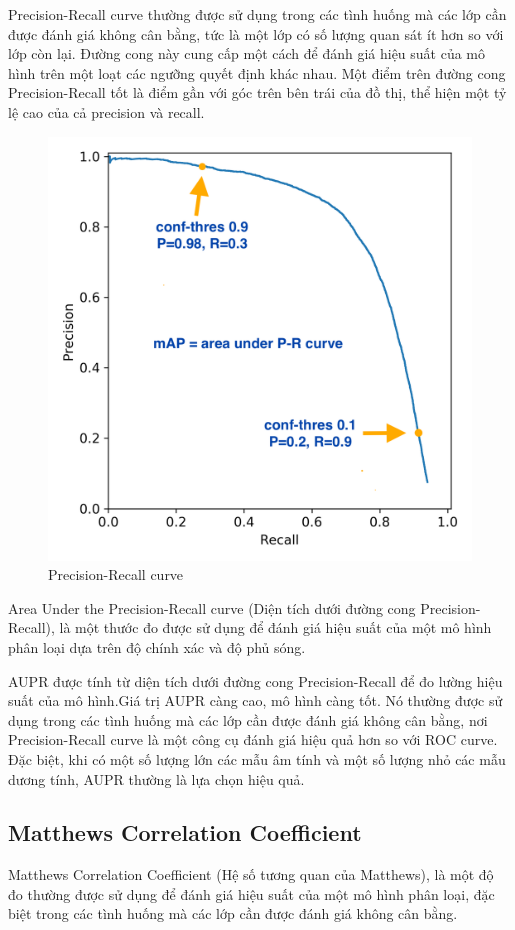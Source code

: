 Precision-Recall curve thường được sử dụng trong các tình huống mà các lớp cần được đánh giá không cân bằng, tức là một lớp có số lượng quan sát ít hơn so với lớp còn lại. Đường cong này cung cấp một cách để đánh giá hiệu suất của mô hình trên một loạt các ngưỡng quyết định khác nhau. Một điểm trên đường cong Precision-Recall tốt là điểm gần với góc trên bên trái của đồ thị, thể hiện một tỷ lệ cao của cả precision và recall.

\begin{figure}[H]
    \centering
    \includegraphics[width=0.7\linewidth]{Images/pr.png}
    \caption{Precision-Recall curve\cite{yolov3issue}}
    \label{pr_curve}
\end{figure}

Area Under the Precision-Recall curve (Diện tích dưới đường cong Precision-Recall), là một thước đo được sử dụng để đánh giá hiệu suất của một mô hình phân loại dựa trên độ chính xác và độ phủ sóng.

AUPR được tính từ diện tích dưới đường cong Precision-Recall để đo lường hiệu suất của mô hình.Giá trị AUPR càng cao, mô hình càng tốt. Nó thường được sử dụng trong các tình huống mà các lớp cần được đánh giá không cân bằng, nơi Precision-Recall curve là một công cụ đánh giá hiệu quả hơn so với ROC curve. Đặc biệt, khi có một số lượng lớn các mẫu âm tính và một số lượng nhỏ các mẫu dương tính, AUPR thường là lựa chọn hiệu quả.

\subsection{Matthews Correlation Coefficient}
Matthews Correlation Coefficient (Hệ số tương quan của Matthews), là một độ đo thường được sử dụng để đánh giá hiệu suất của một mô hình phân loại, đặc biệt trong các tình huống mà các lớp cần được đánh giá không cân bằng.

